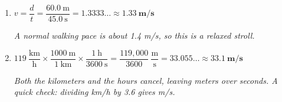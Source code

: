 \documentclass[12pt, twoside]{article}
\begin{document}
\begin{enumerate}[itemsep=0.3cm]
\item $v = \dfrac{d}{t} = \dfrac{60.0~\text{m}}{45.0~\text{s}} = 1.3333\ldots
  \approx \mathbf{1.33~\textbf{m/s}}$

  \emph{A normal walking pace is about 1.4 m/s, so this is a relaxed stroll.}

\item $119~\dfrac{\text{km}}{\text{h}} \times \dfrac{1000~\text{m}}{1~\text{km}}
  \times \dfrac{1~\text{h}}{3600~\text{s}}
  = \dfrac{119{,}000}{3600}~\dfrac{\text{m}}{\text{s}} = 33.055\ldots
  \approx \mathbf{33.1~\textbf{m/s}}$

  \emph{Both the kilometers and the hours cancel, leaving meters over seconds. A quick
  check: dividing km/h by 3.6 gives m/s.}

\end{enumerate}
\end{document}
